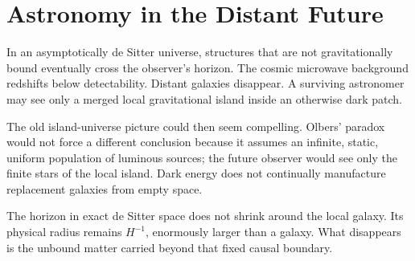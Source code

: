 \section{Astronomy in the Distant Future}

In an asymptotically de Sitter universe, structures that are not gravitationally bound eventually cross the observer's horizon. The cosmic microwave background redshifts below detectability. Distant galaxies disappear. A surviving astronomer may see only a merged local gravitational island inside an otherwise dark patch.

\begin{classroomqa}
\end{classroomqa}

The old island-universe picture could then seem compelling. Olbers' paradox would not force a different conclusion because it assumes an infinite, static, uniform population of luminous sources; the future observer would see only the finite stars of the local island. Dark energy does not continually manufacture replacement galaxies from empty space.

The horizon in exact de Sitter space does not shrink around the local galaxy. Its physical radius remains \(H^{-1}\), enormously larger than a galaxy. What disappears is the unbound matter carried beyond that fixed causal boundary.

\begin{classroomqa}
\end{classroomqa}

\begin{classroomqa}
\end{classroomqa}

